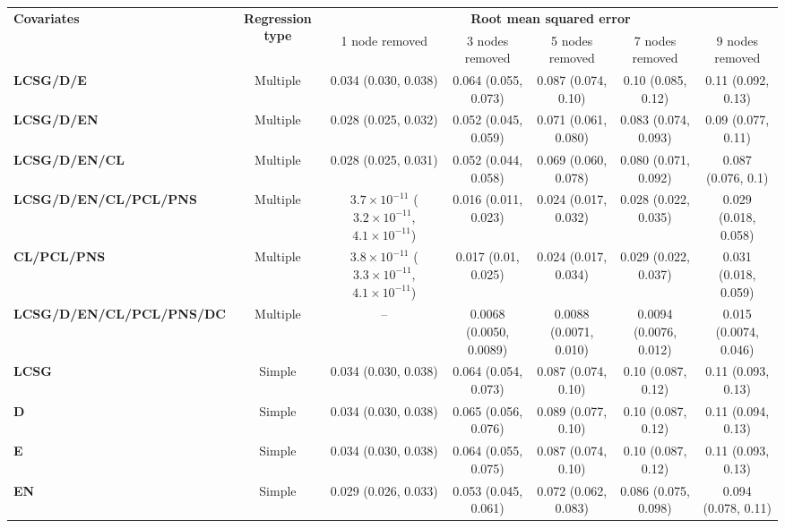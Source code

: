 \begin{landscape}

\vspace*{\fill}
\begin{table}[!hp]
\centering
\tiny
\renewcommand\tabcolsep{3pt}

\begin{tabular}{lcccccc}
\toprule

\multirow{2}{*}{\textbf{Covariates}} & \multirow{2}{*}{\textbf{Regression type}} & \multicolumn{5}{c}{\textbf{Root mean squared error}} \\
 & & 1 node removed & 3 nodes removed & 5 nodes removed & 7 nodes removed & 9 nodes removed \\
\midrule

\textbf{LCSG/D/E} & Multiple & 0.034 (0.030, 0.038) & 0.064 (0.055, 0.073) & 0.087 (0.074, 0.10) & 0.10 (0.085, 0.12) & 0.11 (0.092, 0.13) \\ 
\textbf{LCSG/D/EN} & Multiple & 0.028 (0.025, 0.032) & 0.052 (0.045, 0.059) & 0.071 (0.061, 0.080) & 0.083 (0.074, 0.093) & 0.09 (0.077, 0.11) \\ 
\textbf{LCSG/D/EN/CL} & Multiple & 0.028 (0.025, 0.031) & 0.052 (0.044, 0.058) & 0.069 (0.060, 0.078) & 0.080 (0.071, 0.092) & 0.087 (0.076, 0.1) \\ 
\textbf{LCSG/D/EN/CL/PCL/PNS} & Multiple & $3.7\times10^{-11}$ ($3.2\times10^{-11}$, $4.1\times10^{-11}$) & 0.016 (0.011, 0.023) & 0.024 (0.017, 0.032) & 0.028 (0.022, 0.035) & 0.029 (0.018, 0.058) \\ 
\textbf{CL/PCL/PNS} & Multiple & $3.8\times10^{-11}$ ($3.3\times10^{-11}$, $4.1\times10^{-11}$) & 0.017 (0.01, 0.025) & 0.024 (0.017, 0.034) & 0.029 (0.022, 0.037) & 0.031 (0.018, 0.059) \\ 
\textbf{LCSG/D/EN/CL/PCL/PNS/DC} & Multiple & -- & 0.0068 (0.0050, 0.0089) & 0.0088 (0.0071, 0.010) & 0.0094 (0.0076, 0.012) & 0.015 (0.0074, 0.046) \\ 
\textbf{LCSG} & Simple & 0.034 (0.030, 0.038) & 0.064 (0.054, 0.073) & 0.087 (0.074, 0.10) & 0.10 (0.087, 0.12) & 0.11 (0.093, 0.13) \\ 
\textbf{D} & Simple & 0.034 (0.030, 0.038) & 0.065 (0.056, 0.076) & 0.089 (0.077, 0.10) & 0.10 (0.087, 0.12) & 0.11 (0.094, 0.13) \\ 
\textbf{E} & Simple & 0.034 (0.030, 0.038) & 0.064 (0.055, 0.075) & 0.087 (0.074, 0.10) & 0.10 (0.087, 0.12) & 0.11 (0.093, 0.13) \\ 
\textbf{EN} & Simple & 0.029 (0.026, 0.033) & 0.053 (0.045, 0.061) & 0.072 (0.062, 0.083) & 0.086 (0.075, 0.098) & 0.094 (0.078, 0.11) \\ 

\end{tabular}
\end{table}
\end{landscape}
